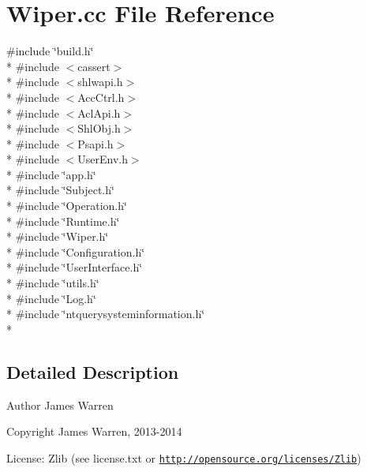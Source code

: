 \section{Wiper.\-cc File Reference}
\label{_wiper_8cc}
{\ttfamily \#include \char`\"{}build.\-h\char`\"{}}\\*
{\ttfamily \#include $<$cassert$>$}\\*
{\ttfamily \#include $<$shlwapi.\-h$>$}\\*
{\ttfamily \#include $<$Acc\-Ctrl.\-h$>$}\\*
{\ttfamily \#include $<$Acl\-Api.\-h$>$}\\*
{\ttfamily \#include $<$Shl\-Obj.\-h$>$}\\*
{\ttfamily \#include $<$Psapi.\-h$>$}\\*
{\ttfamily \#include $<$User\-Env.\-h$>$}\\*
{\ttfamily \#include \char`\"{}app.\-h\char`\"{}}\\*
{\ttfamily \#include \char`\"{}Subject.\-h\char`\"{}}\\*
{\ttfamily \#include \char`\"{}Operation.\-h\char`\"{}}\\*
{\ttfamily \#include \char`\"{}Runtime.\-h\char`\"{}}\\*
{\ttfamily \#include \char`\"{}Wiper.\-h\char`\"{}}\\*
{\ttfamily \#include \char`\"{}Configuration.\-h\char`\"{}}\\*
{\ttfamily \#include \char`\"{}User\-Interface.\-h\char`\"{}}\\*
{\ttfamily \#include \char`\"{}utils.\-h\char`\"{}}\\*
{\ttfamily \#include \char`\"{}Log.\-h\char`\"{}}\\*
{\ttfamily \#include \char`\"{}ntquerysysteminformation.\-h\char`\"{}}\\*


\subsection{Detailed Description}
\begin{DoxyAuthor}{Author}
James Warren 
\end{DoxyAuthor}
\begin{DoxyCopyright}{Copyright}
James Warren, 2013-\/2014 
\end{DoxyCopyright}
\begin{DoxyParagraph}{License\-:}
Zlib (see license.\-txt or \href{http://opensource.org/licenses/Zlib}{\tt http\-://opensource.\-org/licenses/\-Zlib}) 
\end{DoxyParagraph}
